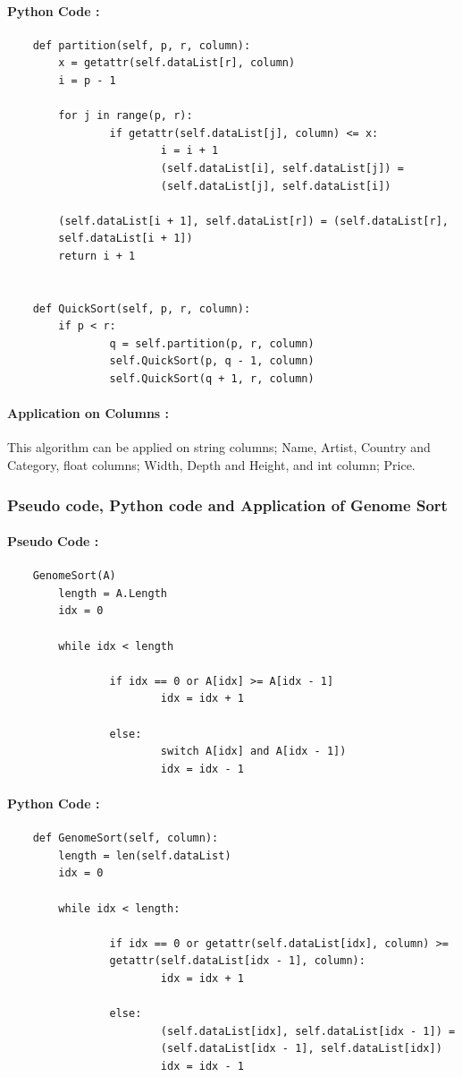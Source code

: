 \documentclass[12pt]{article}
\begin{document}
    \paragraph{Python Code :}
    \begin{verbatim}
    def partition(self, p, r, column):
        x = getattr(self.dataList[r], column)
        i = p - 1

        for j in range(p, r):
                if getattr(self.dataList[j], column) <= x:
                        i = i + 1
                        (self.dataList[i], self.dataList[j]) =
                        (self.dataList[j], self.dataList[i])
        
        (self.dataList[i + 1], self.dataList[r]) = (self.dataList[r],
        self.dataList[i + 1])
        return i + 1


    def QuickSort(self, p, r, column):
        if p < r:
                q = self.partition(p, r, column)
                self.QuickSort(p, q - 1, column)
                self.QuickSort(q + 1, r, column)
    \end{verbatim}
    \paragraph{Application on Columns :} 
    This algorithm can be applied on string columns; Name, Artist, Country and Category, float columns; Width, Depth and Height, and int column; Price.
    
    \subsubsection{Pseudo code, Python code and Application of Genome Sort}
    \paragraph{Pseudo Code :}
    \begin{verbatim}
    GenomeSort(A)
        length = A.Length
        idx = 0 

        while idx < length

                if idx == 0 or A[idx] >= A[idx - 1]
                        idx = idx + 1

                else:
                        switch A[idx] and A[idx - 1])
                        idx = idx - 1
    \end{verbatim}
    \paragraph{Python Code :}
    \begin{verbatim}
    def GenomeSort(self, column):
        length = len(self.dataList)
        idx = 0 

        while idx < length:

                if idx == 0 or getattr(self.dataList[idx], column) >=
                getattr(self.dataList[idx - 1], column):
                        idx = idx + 1

                else:
                        (self.dataList[idx], self.dataList[idx - 1]) =
                        (self.dataList[idx - 1], self.dataList[idx])
                        idx = idx - 1
    \end{verbatim}
\end{document}
